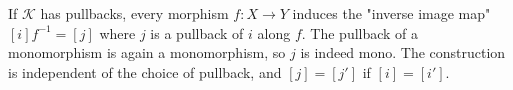 If $\mathcal{K}$ has pullbacks, every morphism $f: X \rightarrow Y$ induces the "inverse image map" $[i]f^{-1} = [j]$ where $j$ is a pullback of $i$ along $f$. The pullback of a monomorphism is again a monomorphism, so $j$ is indeed mono. The construction is independent of the choice of pullback, and $[j] = [j']$ if $[i] = [i']$.
